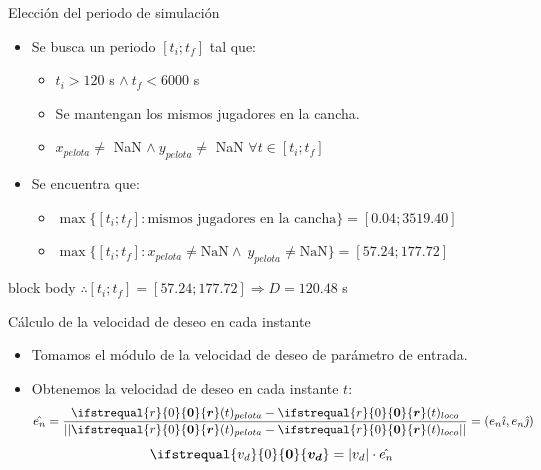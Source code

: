 \documentclass{beamer}
\renewcommand\vec[1]{\ifstrequal{#1}{0}{\ensuremath{\mathbf{0}}}{\ensuremath{\boldsymbol{#1}}}}
\begin{document}
            \begin{frame}{Elección del periodo de simulación}
                \begin{itemize}
                    \item Se busca un periodo \alert{$[t_i ; t_f]$} tal que:
                    \begin{itemize}
                        \item $t_i > 120$ s $\land\ t_f < 6000$ s
                        \item Se mantengan los mismos jugadores en la cancha.
                        \item $x_{pelota} \ne$ NaN $\land\ y_{pelota} \ne$ NaN $\forall t \in [t_i ; t_f]$
                    \end{itemize}
                    \item Se encuentra que:
                    \begin{itemize}
                        \item $\max\{[t_i ; t_f] : \text{mismos jugadores en la cancha}\} = [0.04 ; 3519.40]$
                        \item $\max\{[t_i ; t_f] : x_{pelota} \ne \text{NaN} \land\ y_{pelota} \ne \text{NaN}\} = [57.24 ; 177.72]$
                    \end{itemize}
                \end{itemize}
                \begin{beamercolorbox}[sep=5pt,center]{block body}
                    \centering
                    $\therefore [t_i ; t_f] = [57.24 ; 177.72] \Rightarrow D = 120.48$ s
                \end{beamercolorbox}
            \end{frame}

            \begin{frame}{Cálculo de la velocidad de deseo en cada instante}
                \begin{itemize}
                    \item Tomamos el módulo de la velocidad de deseo de parámetro de entrada.
                    \item Obtenemos la velocidad de deseo en cada instante $t$:
                        \begin{equation*}
                            \hat{e_n} = \frac{\vec{r}(t)_{pelota} - \vec{r}(t)_{loco}}{||\vec{r}(t)_{pelota} - \vec{r}(t)_{loco}||}= (e_n \hat{\imath}, e_n \hat{\jmath})
                        \end{equation*}
                        \begin{equation*}
                            \vec{v_d} = |v_d| \cdot \hat{e_n}
                        \end{equation*}
                \end{itemize}
            \end{frame}
\end{document}
